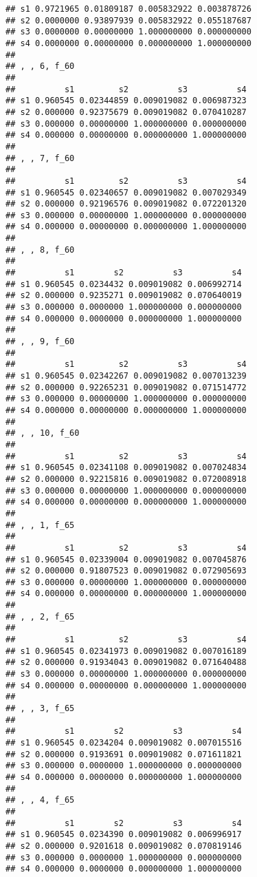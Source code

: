 \documentclass[
]{article}
\begin{document}
\begin{verbatim}
## s1 0.9721965 0.01809187 0.005832922 0.003878726
## s2 0.0000000 0.93897939 0.005832922 0.055187687
## s3 0.0000000 0.00000000 1.000000000 0.000000000
## s4 0.0000000 0.00000000 0.000000000 1.000000000
## 
## , , 6, f_60
## 
##          s1         s2          s3          s4
## s1 0.960545 0.02344859 0.009019082 0.006987323
## s2 0.000000 0.92375679 0.009019082 0.070410287
## s3 0.000000 0.00000000 1.000000000 0.000000000
## s4 0.000000 0.00000000 0.000000000 1.000000000
## 
## , , 7, f_60
## 
##          s1         s2          s3          s4
## s1 0.960545 0.02340657 0.009019082 0.007029349
## s2 0.000000 0.92196576 0.009019082 0.072201320
## s3 0.000000 0.00000000 1.000000000 0.000000000
## s4 0.000000 0.00000000 0.000000000 1.000000000
## 
## , , 8, f_60
## 
##          s1        s2          s3          s4
## s1 0.960545 0.0234432 0.009019082 0.006992714
## s2 0.000000 0.9235271 0.009019082 0.070640019
## s3 0.000000 0.0000000 1.000000000 0.000000000
## s4 0.000000 0.0000000 0.000000000 1.000000000
## 
## , , 9, f_60
## 
##          s1         s2          s3          s4
## s1 0.960545 0.02342267 0.009019082 0.007013239
## s2 0.000000 0.92265231 0.009019082 0.071514772
## s3 0.000000 0.00000000 1.000000000 0.000000000
## s4 0.000000 0.00000000 0.000000000 1.000000000
## 
## , , 10, f_60
## 
##          s1         s2          s3          s4
## s1 0.960545 0.02341108 0.009019082 0.007024834
## s2 0.000000 0.92215816 0.009019082 0.072008918
## s3 0.000000 0.00000000 1.000000000 0.000000000
## s4 0.000000 0.00000000 0.000000000 1.000000000
## 
## , , 1, f_65
## 
##          s1         s2          s3          s4
## s1 0.960545 0.02339004 0.009019082 0.007045876
## s2 0.000000 0.91807523 0.009019082 0.072905693
## s3 0.000000 0.00000000 1.000000000 0.000000000
## s4 0.000000 0.00000000 0.000000000 1.000000000
## 
## , , 2, f_65
## 
##          s1         s2          s3          s4
## s1 0.960545 0.02341973 0.009019082 0.007016189
## s2 0.000000 0.91934043 0.009019082 0.071640488
## s3 0.000000 0.00000000 1.000000000 0.000000000
## s4 0.000000 0.00000000 0.000000000 1.000000000
## 
## , , 3, f_65
## 
##          s1        s2          s3          s4
## s1 0.960545 0.0234204 0.009019082 0.007015516
## s2 0.000000 0.9193691 0.009019082 0.071611821
## s3 0.000000 0.0000000 1.000000000 0.000000000
## s4 0.000000 0.0000000 0.000000000 1.000000000
## 
## , , 4, f_65
## 
##          s1        s2          s3          s4
## s1 0.960545 0.0234390 0.009019082 0.006996917
## s2 0.000000 0.9201618 0.009019082 0.070819146
## s3 0.000000 0.0000000 1.000000000 0.000000000
## s4 0.000000 0.0000000 0.000000000 1.000000000

\end{verbatim}
\end{document}
